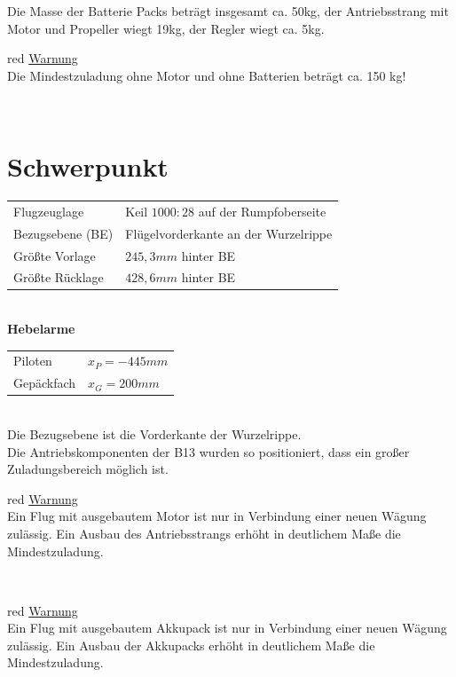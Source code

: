 \vspace{0.5cm}
Die Masse der Batterie Packs beträgt insgesamt ca. 50kg, der Antriebsstrang mit Motor und Propeller wiegt 19kg, der Regler wiegt ca. 5kg.

\begin{color}{red}
\large{\underline{Warnung}}\\
Die Mindestzuladung ohne Motor und ohne Batterien beträgt ca. 150 kg!
\end{color}\\


\section{Schwerpunkt}
\begin{tabular}{l l}
Flugzeuglage & Keil $1000:28$ auf der Rumpfoberseite\\
Bezugsebene (BE) & Flügelvorderkante an der Wurzelrippe \\
Größte Vorlage & $245,3mm$ hinter BE\\
Größte Rücklage & $428,6mm$ hinter BE\\
\end{tabular}\\

\vspace{0.5cm}
\textbf{Hebelarme}\\
\begin{tabular}{m{} m{3cm}}
Piloten & $x_P=-445mm$\\
Gepäckfach & $x_G=200mm$\\
\end{tabular}\\

Die Bezugsebene ist die Vorderkante der Wurzelrippe.\\

Die Antriebskomponenten der B13 wurden so positioniert, dass ein großer Zuladungsbereich möglich ist. \\


\begin{color}{red}
\large{\underline{Warnung}}\\
Ein Flug mit ausgebautem Motor ist nur in Verbindung einer neuen Wägung zulässig. Ein Ausbau des Antriebsstrangs erhöht in deutlichem Maße die Mindestzuladung.
\end{color}\\


\begin{color}{red}
\large{\underline{Warnung}}\\
Ein Flug mit ausgebautem Akkupack ist nur in Verbindung einer neuen Wägung zulässig. Ein Ausbau der Akkupacks erhöht in deutlichem Maße die Mindestzuladung.
\end{color}\\

